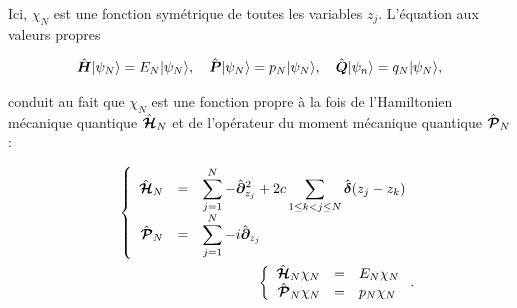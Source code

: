 Ici, $\chi_N$ est une fonction symétrique de toutes les variables $z_j$. L'équation aux valeurs propres 

\begin{eqnarray}
	\hat{\bm{H}} |\psi_N\rangle = E_N |\psi_N\rangle, \quad \hat{\bm{P}} |\psi_N\rangle = p_N |\psi_N\rangle, \quad \hat{\bm{Q}} |\psi_n\rangle = q_N |\psi_N\rangle,	
\end{eqnarray}

conduit au fait que $\chi_N$ est une fonction propre à la fois de l'Hamiltonien mécanique quantique $\hat{\bm{\mathcal{H}}}_N$ et de l'opérateur du moment mécanique quantique $\hat{\bm{\mathcal{P}}}_N$ :

\begin{eqnarray}
	&& \left \{ \begin{array}{rcl} \hat{\bm{ \mathcal{H}}}_N & = & \displaystyle \sum_{j=1}^N   - \hat{\bm{\partial}}_{z_j}^2 + 2c \sum_{1 \leq k < j \leq N } \hat{\bm{\delta}} ( z_j - z_k) \\ \hat{\bm{\mathcal{P}}}_N & = & \displaystyle \sum_{j=1}^N -i \hat{\bm{\partial}}_{z_j}\end{array} \right .  \label{eq.1.11}\\
	&& \left \{ \begin{array}{rcl}\hat{\bm{ \mathcal{H}}}_N \chi_N &=&	E_N \chi_N \\ \hat{\bm{ \mathcal{P}}}_N \chi_N &=&	p_N \chi_N\end{array} \right . .\label{eq.1.12}
\end{eqnarray}


